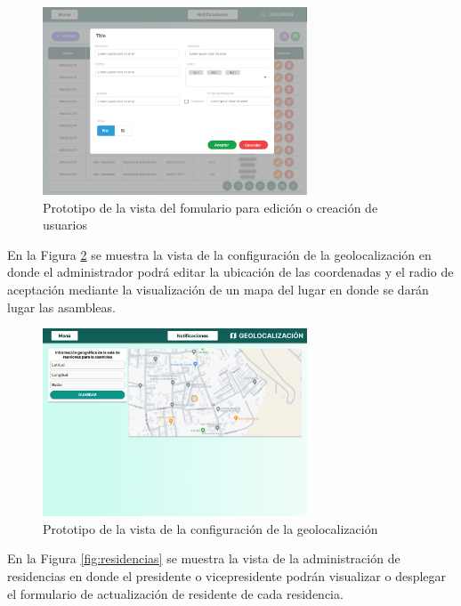 \begin{figure}[H]
    \centering
    \includegraphics[width=0.7\textwidth]{resources/images/usuarios formulario}
    \caption{Prototipo de la vista del fomulario para edición o creación de usuarios}
    \label{fig:usuarios formulario}
\end{figure}

En la Figura \ref{fig:geolocalizacion} se muestra la vista de la configuración de la geolocalización en donde el administrador podrá editar la ubicación de las coordenadas y el radio de aceptación mediante la visualización de un mapa del lugar en donde se darán lugar las asambleas.

\begin{figure}[H]
    \centering
    \includegraphics[width=0.7\textwidth]{resources/images/geolocalizacion}
    \caption{Prototipo de la vista de la configuración de la geolocalización}
    \label{fig:geolocalizacion}
\end{figure}

En la Figura \ref{fig:residencias} se muestra la vista de la administración de residencias en donde el presidente o vicepresidente podrán visualizar o desplegar el formulario de actualización de residente de cada residencia.

